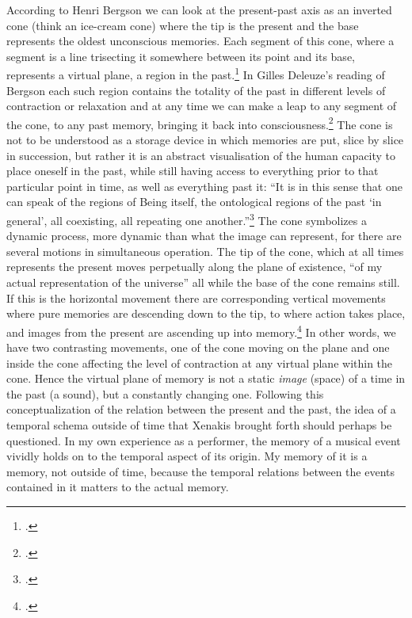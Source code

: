 
According to Henri Bergson we can look at the present-past axis as an inverted cone (think an ice-cream cone) where the tip is the present and the base represents the oldest unconscious memories. Each segment of this cone, where a segment is a line trisecting it somewhere between its point and its base, represents a virtual plane, a region in the past.\footcite[][Ch.3]{bergson91} 
In Gilles Deleuze's reading of Bergson each such region contains the totality of the past in different levels of contraction or relaxation and at any time we can make a leap to any segment of the cone, to any past memory, bringing it back into consciousness.\footcite[][60]{deleuze88} The cone is not to be understood as a storage device in which memories are put, slice by slice in succession, but rather it is an abstract visualisation of the human capacity to place oneself in the past, while still having access to everything prior to that particular point in time, as well as everything past it: ``It is in this sense that one can speak of the regions of Being itself, the ontological regions of the past `in general', all coexisting, all repeating one another.''\footcite[61]{deleuze88}
The cone symbolizes a dynamic process, more dynamic than what the image can represent, for there are several motions in simultaneous operation. The tip of the cone, which at all times represents the present moves perpetually along the plane of existence, ``of my actual representation of the universe'' all while the base of the cone remains still. If this is the horizontal movement there are corresponding vertical movements where pure memories are descending down to the tip, to where action takes place, and images from the present are ascending up into memory.\footcite[See also][47-8]{lawlor03} In other words, we have two contrasting movements, one of the cone moving on the plane and one inside the cone affecting the level of contraction at any virtual plane within the cone. Hence the virtual plane of memory is not a static \emph{image} (space) of a time in the past (a sound), but a constantly changing one. Following this conceptualization of the relation between the present and the past, the idea of a temporal schema outside of time that Xenakis brought forth should perhaps be questioned. In my own experience as a performer, the memory of a musical event vividly holds on to the temporal aspect of its origin. My memory of it is a memory, not outside of time, because the temporal relations between the events contained in it matters to the actual memory.

